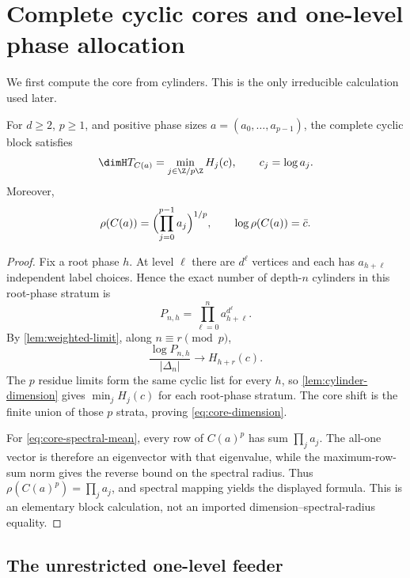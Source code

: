 \section{Complete cyclic cores and one-level phase allocation}
\label{sec:core-feeder}

We first compute the core from cylinders.  This is the only irreducible
calculation used later.

\begin{theorem}
\label{thm:core}
For $d\geq2$, $p\geq1$, and positive phase sizes
$a=(a_0,\ldots,a_{p-1})$, the complete cyclic block satisfies
\begin{equation}
 \dimH T_{C(a)}=\min_{j\in\Z/p\Z}H_j(c),
 \qquad c_j=\log a_j.
 \label{eq:core-dimension}
\end{equation}
Moreover,
\begin{equation}
 \rho(C(a))=\Bigl(\prod_{j=0}^{p-1}a_j\Bigr)^{1/p},
 \qquad \log\rho(C(a))=\bar c.
 \label{eq:core-spectral-mean}
\end{equation}
\end{theorem}

\begin{proof}
Fix a root phase $h$.  At level $\ell$ there are $d^\ell$ vertices and each
has $a_{h+\ell}$ independent label choices.  Hence the exact number of
depth-$n$ cylinders in this root-phase stratum is
\begin{equation}
 P_{n,h}=\prod_{\ell=0}^n a_{h+\ell}^{d^\ell}.
 \label{eq:core-prefix-count}
\end{equation}
By \cref{lem:weighted-limit}, along $n\equiv r\pmod p$,
\[
 \frac{\log P_{n,h}}{|\Delta_n|}\longrightarrow H_{h+r}(c).
\]
The $p$ residue limits form the same cyclic list for every $h$, so
\cref{lem:cylinder-dimension} gives $\min_jH_j(c)$ for each root-phase
stratum.  The core shift is the finite union of those $p$ strata, proving
\eqref{eq:core-dimension}.

For \eqref{eq:core-spectral-mean}, every row of $C(a)^p$ has sum
$\prod_j a_j$.  The all-one vector is therefore an eigenvector with that
eigenvalue, while the maximum-row-sum norm gives the reverse bound on the
spectral radius.  Thus $\rho(C(a)^p)=\prod_j a_j$, and spectral mapping yields
the displayed formula.  This is an elementary block calculation, not an
imported dimension--spectral-radius equality.
\end{proof}

\subsection{The unrestricted one-level feeder}

